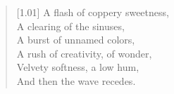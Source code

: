 \begin{verse}[1.01\textwidth]
    A flash of coppery sweetness,\\
    A clearing of the sinuses,\\
    A burst of unnamed colors,\\
    A rush of creativity, of wonder,\\
    Velvety softness, a low hum,\\
    And then the wave recedes.
\end{verse}
